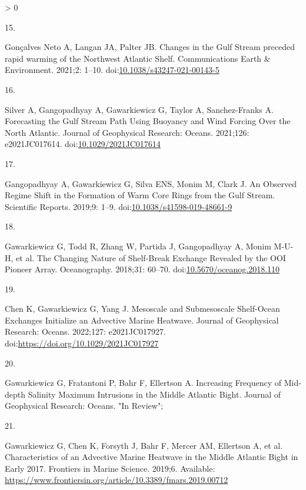 \documentclass[
  10pt,
]{article}
\newlength{\cslhangindent}
\newlength{\csllabelwidth}
\newenvironment{CSLReferences}[2] %
 {%
  \setlength{\parindent}{0pt}
  \ifodd #1 \everypar{\setlength{\hangindent}{\cslhangindent}}\ignorespaces\fi
  \ifnum #2 > 0
  \setlength{\parskip}{#2\baselineskip}
  \fi
 }%
 {}
\newcommand{\CSLLeftMargin}[1]{\parbox[t]{\csllabelwidth}{#1}}
\newcommand{\CSLRightInline}[1]{\parbox[t]{\linewidth - \csllabelwidth}{#1}\break}
\begin{document}
\begin{CSLReferences}{0}{0}
\leavevmode\hypertarget{ref-goncalves_neto_changes_2021}{}%
\CSLLeftMargin{15. }
\CSLRightInline{Gonçalves Neto A, Langan JA, Palter JB. Changes in the
{Gulf} {Stream} preceded rapid warming of the {Northwest} {Atlantic}
{Shelf}. Communications Earth \& Environment. 2021;2: 1--10.
doi:\href{https://doi.org/10.1038/s43247-021-00143-5}{10.1038/s43247-021-00143-5}}

\leavevmode\hypertarget{ref-silver_forecasting_2021}{}%
\CSLLeftMargin{16. }
\CSLRightInline{Silver A, Gangopadhyay A, Gawarkiewicz G, Taylor A,
Sanchez-Franks A. Forecasting the {Gulf} {Stream} {Path} {Using}
{Buoyancy} and {Wind} {Forcing} {Over} the {North} {Atlantic}. Journal
of Geophysical Research: Oceans. 2021;126: e2021JC017614.
doi:\href{https://doi.org/10.1029/2021JC017614}{10.1029/2021JC017614}}

\leavevmode\hypertarget{ref-gangopadhyay_observed_2019}{}%
\CSLLeftMargin{17. }
\CSLRightInline{Gangopadhyay A, Gawarkiewicz G, Silva ENS, Monim M,
Clark J. An {Observed} {Regime} {Shift} in the {Formation} of {Warm}
{Core} {Rings} from the {Gulf} {Stream}. Scientific Reports. 2019;9:
1--9.
doi:\href{https://doi.org/10.1038/s41598-019-48661-9}{10.1038/s41598-019-48661-9}}

\leavevmode\hypertarget{ref-gawarkiewicz_changing_2018}{}%
\CSLLeftMargin{18. }
\CSLRightInline{Gawarkiewicz G, Todd R, Zhang W, Partida J, Gangopadhyay
A, Monim M-U-H, et al. The {Changing} {Nature} of {Shelf}-{Break}
{Exchange} {Revealed} by the {OOI} {Pioneer} {Array}. Oceanography.
2018;31: 60--70.
doi:\href{https://doi.org/10.5670/oceanog.2018.110}{10.5670/oceanog.2018.110}}

\leavevmode\hypertarget{ref-chen_mesoscale_2022}{}%
\CSLLeftMargin{19. }
\CSLRightInline{Chen K, Gawarkiewicz G, Yang J. Mesoscale and
{Submesoscale} {Shelf}-{Ocean} {Exchanges} {Initialize} an {Advective}
{Marine} {Heatwave}. Journal of Geophysical Research: Oceans. 2022;127:
e2021JC017927. doi:\url{https://doi.org/10.1029/2021JC017927}}

\leavevmode\hypertarget{ref-gawarkiewicz_increasing_nodate}{}%
\CSLLeftMargin{20. }
\CSLRightInline{Gawarkiewicz G, Fratantoni P, Bahr F, Ellertson A.
Increasing {Frequency} of {Mid}-depth {Salinity} {Maximum} {Intrusions}
in the {Middle} {Atlantic} {Bight}. Journal of Geophysical Research:
Oceans. "In Review"; }

\leavevmode\hypertarget{ref-gawarkiewicz_characteristics_2019}{}%
\CSLLeftMargin{21. }
\CSLRightInline{Gawarkiewicz G, Chen K, Forsyth J, Bahr F, Mercer AM,
Ellertson A, et al. Characteristics of an {Advective} {Marine}
{Heatwave} in the {Middle} {Atlantic} {Bight} in {Early} 2017. Frontiers
in Marine Science. 2019;6. Available:
\url{https://www.frontiersin.org/article/10.3389/fmars.2019.00712}}


\end{CSLReferences}
\end{document}
